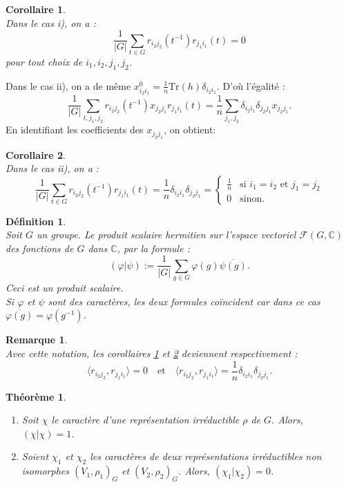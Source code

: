 \documentclass[a4paper, 14pt]{report}
\newtheorem{definition}{Définition}[section]
\newtheorem{remark}{Remarque}[section]
\newtheorem{theorem}{Théorème}[section]
\newtheorem{corollary}{Corollaire}[section]
\begin{document}
\begin{onehalfspace}
{\begin{corollary} \cite{serre1971representation} \label{cor2}\\
Dans le cas i), on a :
\[
\frac{1}{|G|} \sum_{t \in G} r_{i_2 j_2}(t^{-1}) r_{j_1 i_1}(t) = 0
\]
pour tout choix de $i_1, i_2, j_1, j_2$. \\
\end{corollary}

Dans le cas ii), on a de même  $x^0_{i_2 i_1} = \frac{1}{n} \text{Tr}(h) \delta_{i_2 i_1}$. D’où l’égalité :
\[
\frac{1}{|G|} \sum_{t, j_1, j_2} r_{i_2 j_2}(t^{-1}) x_{j_2 j_1} r_{j_1 i_1}(t)
= \frac{1}{n} \sum_{j_1, j_2} \delta_{i_2 i_1} \delta_{j_2 j_1} x_{j_2 j_1}.
\]
En identifiant les coefficients des $x_{j_2 j_1}$, on obtient:

\begin{corollary} \cite{serre1971representation} \label{cor3}\\
Dans le cas ii), on a :
\[
\frac{1}{|G|} \sum_{t \in G} r_{i_2 j_2}(t^{-1}) r_{j_1 i_1}(t)
= \frac{1}{n} \delta_{i_2 i_1} \delta_{j_2 j_1}
= \begin{cases}
	\frac{1}{n} & \text{si } i_1 = i_2 \text{ et } j_1 = j_2 \\
	0 & \text{sinon}.
\end{cases}
\]
\end{corollary}


\begin{definition} \cite{serre1971representation}\\
Soit $G$ un groupe. Le produit scalaire hermitien sur l’espace vectoriel $\mathscr{F}(G, \mathbb{C})$ des fonctions de $G$ dans $\mathbb{C}$, par la formule :
	\[
	(\varphi | \psi) := \frac{1}{|G|} \sum_{g \in G} \varphi(g) \overline{\psi(g)}.
	\]
Ceci est un produit scalaire.\\
Si $\varphi$ et $\psi$ sont des caractères, les deux formules coïncident car dans ce cas $\overline{\varphi(g)} = \varphi(g^{-1})$.
\end{definition}

\begin{remark} \cite{serre1971representation} \label{remarq0}\\
Avec cette notation, les corollaires \ref{cor2} et \ref{cor3} deviennent respectivement :
\[
\langle r_{i_2 j_2}, r_{j_1 i_1} \rangle = 0 \quad \text{et} \quad
\langle r_{i_2 j_2}, r_{j_1 i_1} \rangle = \frac{1}{n} \delta_{i_2 i_1} \delta_{j_2 j_1}.
\]
\end{remark}

\begin{theorem} \cite{serre1971representation}
	\begin{enumerate}[label=\roman*)]
		\item Soit \( \chi \) le caractère d’une représentation irréductible \( \rho \) de \( G \). Alors, \( (\chi | \chi) = 1 \).
		\item Soient \( \chi_1 \) et \( \chi_2 \) les caractères de deux représentations irréductibles non isomorphes \((V_1,\rho_1)_{G}\) et \((V_2,\rho_2)_{G}\). Alors, \( (\chi_1 | \chi_2) = 0 \).
	\end{enumerate}
\end{theorem}

}
\end{onehalfspace}
\end{document}
